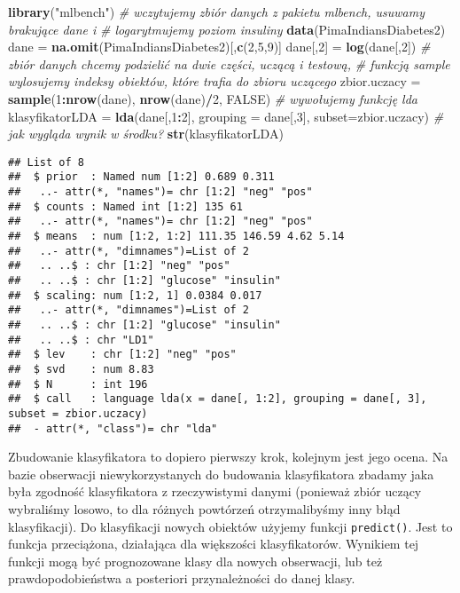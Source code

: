 \documentclass[polish,]{book}
\newenvironment{Shaded}{\begin{snugshade}}{\end{snugshade}}
\newcommand{\CommentTok}[1]{\textcolor[rgb]{0.56,0.35,0.01}{\textit{#1}}}
\newcommand{\DataTypeTok}[1]{\textcolor[rgb]{0.13,0.29,0.53}{#1}}
\newcommand{\DecValTok}[1]{\textcolor[rgb]{0.00,0.00,0.81}{#1}}
\newcommand{\KeywordTok}[1]{\textcolor[rgb]{0.13,0.29,0.53}{\textbf{#1}}}
\newcommand{\NormalTok}[1]{#1}
\newcommand{\OperatorTok}[1]{\textcolor[rgb]{0.81,0.36,0.00}{\textbf{#1}}}
\newcommand{\OtherTok}[1]{\textcolor[rgb]{0.56,0.35,0.01}{#1}}
\newcommand{\StringTok}[1]{\textcolor[rgb]{0.31,0.60,0.02}{#1}}
\begin{document}
\begin{Shaded}
\begin{Highlighting}[]
\KeywordTok{library}\NormalTok{(}\StringTok{"mlbench"}\NormalTok{)}
\CommentTok{# wczytujemy zbiór danych z pakietu mlbench, usuwamy brakujące dane i}
\CommentTok{# logarytmujemy poziom insuliny}
\KeywordTok{data}\NormalTok{(PimaIndiansDiabetes2)}
\NormalTok{dane =}\StringTok{ }\KeywordTok{na.omit}\NormalTok{(PimaIndiansDiabetes2)[,}\KeywordTok{c}\NormalTok{(}\DecValTok{2}\NormalTok{,}\DecValTok{5}\NormalTok{,}\DecValTok{9}\NormalTok{)]}
\NormalTok{dane[,}\DecValTok{2}\NormalTok{] =}\StringTok{ }\KeywordTok{log}\NormalTok{(dane[,}\DecValTok{2}\NormalTok{])}
\CommentTok{# zbiór danych chcemy podzielić na dwie części, uczącą i testową,}
\CommentTok{# funkcją sample wylosujemy indeksy obiektów, które trafia do zbioru uczącego}
\NormalTok{zbior.uczacy =}\StringTok{ }\KeywordTok{sample}\NormalTok{(}\DecValTok{1}\OperatorTok{:}\KeywordTok{nrow}\NormalTok{(dane), }\KeywordTok{nrow}\NormalTok{(dane)}\OperatorTok{/}\DecValTok{2}\NormalTok{, }\OtherTok{FALSE}\NormalTok{)}
\CommentTok{# wywołujemy funkcję lda}
\NormalTok{klasyfikatorLDA =}\StringTok{ }\KeywordTok{lda}\NormalTok{(dane[,}\DecValTok{1}\OperatorTok{:}\DecValTok{2}\NormalTok{], }\DataTypeTok{grouping =}\NormalTok{ dane[,}\DecValTok{3}\NormalTok{], }\DataTypeTok{subset=}\NormalTok{zbior.uczacy)}
\CommentTok{# jak wygląda wynik w środku?}
\KeywordTok{str}\NormalTok{(klasyfikatorLDA)}
\end{Highlighting}
\end{Shaded}

\begin{verbatim}
## List of 8
##  $ prior  : Named num [1:2] 0.689 0.311
##   ..- attr(*, "names")= chr [1:2] "neg" "pos"
##  $ counts : Named int [1:2] 135 61
##   ..- attr(*, "names")= chr [1:2] "neg" "pos"
##  $ means  : num [1:2, 1:2] 111.35 146.59 4.62 5.14
##   ..- attr(*, "dimnames")=List of 2
##   .. ..$ : chr [1:2] "neg" "pos"
##   .. ..$ : chr [1:2] "glucose" "insulin"
##  $ scaling: num [1:2, 1] 0.0384 0.017
##   ..- attr(*, "dimnames")=List of 2
##   .. ..$ : chr [1:2] "glucose" "insulin"
##   .. ..$ : chr "LD1"
##  $ lev    : chr [1:2] "neg" "pos"
##  $ svd    : num 8.83
##  $ N      : int 196
##  $ call   : language lda(x = dane[, 1:2], grouping = dane[, 3], subset = zbior.uczacy)
##  - attr(*, "class")= chr "lda"
\end{verbatim}

Zbudowanie klasyfikatora to dopiero pierwszy krok, kolejnym jest jego ocena.
Na bazie obserwacji niewykorzystanych do budowania klasyfikatora zbadamy jaka
była zgodność klasyfikatora z rzeczywistymi danymi (ponieważ zbiór uczący wybraliśmy losowo, to dla różnych powtórzeń otrzymalibyśmy inny błąd klasyfikacji).
Do klasyfikacji nowych obiektów użyjemy funkcji \texttt{predict()}. Jest to funkcja przeciążona, działająca dla większości klasyfikatorów. Wynikiem tej funkcji mogą być
prognozowane klasy dla nowych obserwacji, lub też prawdopodobieństwa a posteriori przynależności do danej klasy.
\end{document}
